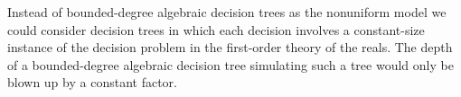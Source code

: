 Instead of bounded-degree algebraic decision trees as the nonuniform model
we could consider decision trees in which
each decision involves a constant-size instance of the decision problem in the
first-order theory of the reals. The depth of a bounded-degree algebraic
decision tree simulating such a tree would only be blown up by a constant factor.
